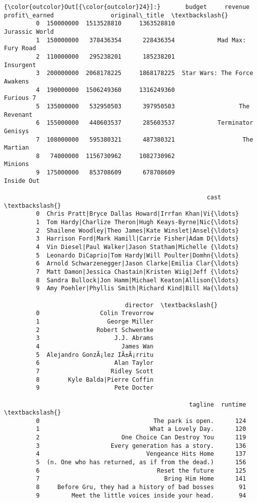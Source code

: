 \documentclass[11pt]{article}
\begin{document}
\begin{Verbatim}[commandchars=\\\{\}]
{\color{outcolor}Out[{\color{outcolor}24}]:}       budget     revenue  profit\_earned                original\_title  \textbackslash{}
         0  150000000  1513528810     1363528810                Jurassic World   
         1  150000000   378436354      228436354            Mad Max: Fury Road   
         2  110000000   295238201      185238201                     Insurgent   
         3  200000000  2068178225     1868178225  Star Wars: The Force Awakens   
         4  190000000  1506249360     1316249360                     Furious 7   
         5  135000000   532950503      397950503                  The Revenant   
         6  155000000   440603537      285603537            Terminator Genisys   
         7  108000000   595380321      487380321                   The Martian   
         8   74000000  1156730962     1082730962                       Minions   
         9  175000000   853708609      678708609                    Inside Out   
         
                                                         cast  \textbackslash{}
         0  Chris Pratt|Bryce Dallas Howard|Irrfan Khan|Vi{\ldots}   
         1  Tom Hardy|Charlize Theron|Hugh Keays-Byrne|Nic{\ldots}   
         2  Shailene Woodley|Theo James|Kate Winslet|Ansel{\ldots}   
         3  Harrison Ford|Mark Hamill|Carrie Fisher|Adam D{\ldots}   
         4  Vin Diesel|Paul Walker|Jason Statham|Michelle {\ldots}   
         5  Leonardo DiCaprio|Tom Hardy|Will Poulter|Domhn{\ldots}   
         6  Arnold Schwarzenegger|Jason Clarke|Emilia Clar{\ldots}   
         7  Matt Damon|Jessica Chastain|Kristen Wiig|Jeff {\ldots}   
         8  Sandra Bullock|Jon Hamm|Michael Keaton|Allison{\ldots}   
         9  Amy Poehler|Phyllis Smith|Richard Kind|Bill Ha{\ldots}   
         
                                  director  \textbackslash{}
         0                 Colin Trevorrow   
         1                   George Miller   
         2                Robert Schwentke   
         3                     J.J. Abrams   
         4                       James Wan   
         5  Alejandro GonzÃ¡lez IÃ±Ã¡rritu   
         6                     Alan Taylor   
         7                    Ridley Scott   
         8        Kyle Balda|Pierre Coffin   
         9                     Pete Docter   
         
                                                    tagline  runtime  \textbackslash{}
         0                                The park is open.      124   
         1                               What a Lovely Day.      120   
         2                       One Choice Can Destroy You      119   
         3                    Every generation has a story.      136   
         4                              Vengeance Hits Home      137   
         5  (n. One who has returned, as if from the dead.)      156   
         6                                 Reset the future      125   
         7                                   Bring Him Home      141   
         8     Before Gru, they had a history of bad bosses       91   
         9         Meet the little voices inside your head.       94   
         

\end{Verbatim}
\end{document}
